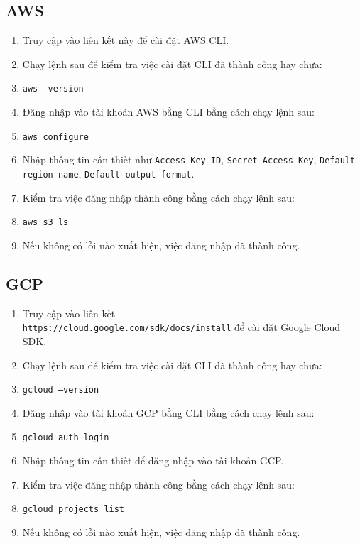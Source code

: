 \subsection{AWS}
\begin{enumerate}
\item Truy cập vào liên kết \href{https://docs.aws.amazon.com/cli/latest/userguide/install-cliv2.html}{này} để cài đặt AWS CLI.
\item Chạy lệnh sau để kiểm tra việc cài đặt CLI đã thành công hay chưa:
\item \texttt{aws --version}
\item Đăng nhập vào tài khoản AWS bằng CLI bằng cách chạy lệnh sau:
\item \texttt{aws configure}
\item Nhập thông tin cần thiết như \texttt{Access Key ID}, \texttt{Secret Access Key}, \texttt{Default region name}, \texttt{Default output format}.
\item Kiểm tra việc đăng nhập thành công bằng cách chạy lệnh sau:
\item \texttt{aws s3 ls}
\item Nếu không có lỗi nào xuất hiện, việc đăng nhập đã thành công.
\end{enumerate}

\subsection{GCP}
\begin{enumerate}
\item Truy cập vào liên kết \\
\texttt{https://cloud.google.com/sdk/docs/install} để cài đặt Google Cloud SDK.
\item Chạy lệnh sau để kiểm tra việc cài đặt CLI đã thành công hay chưa:
\item \texttt{gcloud --version}
\item Đăng nhập vào tài khoản GCP bằng CLI bằng cách chạy lệnh sau:
\item \texttt{gcloud auth login}
\item Nhập thông tin cần thiết để đăng nhập vào tài khoản GCP.
\item Kiểm tra việc đăng nhập thành công bằng cách chạy lệnh sau:
\item \texttt{gcloud projects list}
\item Nếu không có lỗi nào xuất hiện, việc đăng nhập đã thành công.
\end{enumerate}

